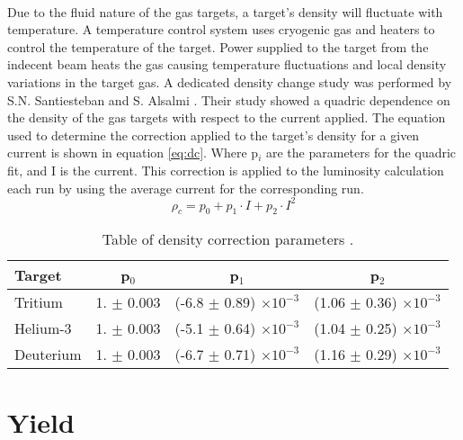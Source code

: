 \paragraph{}  Due to the fluid nature of the gas targets, a target's density will fluctuate with temperature. A temperature control system uses cryogenic gas and heaters to control the temperature of the target. Power supplied to the target from the indecent beam heats the gas causing temperature fluctuations and local density variations in the target gas. A dedicated density change study was performed by S.N. Santiesteban and S. Alsalmi \cite{denscor}. Their study showed a quadric dependence on the density of the gas targets with respect to the current applied. The equation used to determine the correction applied to the target's density for a given current is shown in equation \ref{eq:dc}. Where p$_i$ are the parameters for the quadric fit, and I is the current. This correction is applied to the luminosity calculation each run by using the average current for the corresponding run. 
\begin{equation}
\rho_c = p_0 + p_1 \cdot I + p_2 \cdot I^2 \label{eq:dc}
\end{equation}
\begin{table}[]
	\caption{Table of density correction parameters \cite{denscor}.}
	\centering
	\begin{tabular}{lccc}
		Target & p$_0$ & p$_1$ & p$_2$  \\
		\hline
		Tritium & 1. $\pm$ 0.003 & (-6.8 $\pm$ 0.89) $\times 10^{-3}$ & (1.06 $\pm$ 0.36) $\times 10^{-3}$\\
		Helium-3 & 1. $\pm$ 0.003 & (-5.1 $\pm$ 0.64) $\times 10^{-3}$ & (1.04 $\pm$ 0.25) $\times 10^{-3}$\\
		Deuterium & 1. $\pm$ 0.003 & (-6.7 $\pm$ 0.71) $\times 10^{-3}$ & (1.16 $\pm$ 0.29) $\times 10^{-3}$\\
		\hline
	\end{tabular}
\end{table}

\section{Yield}\label{sec:Yield}
